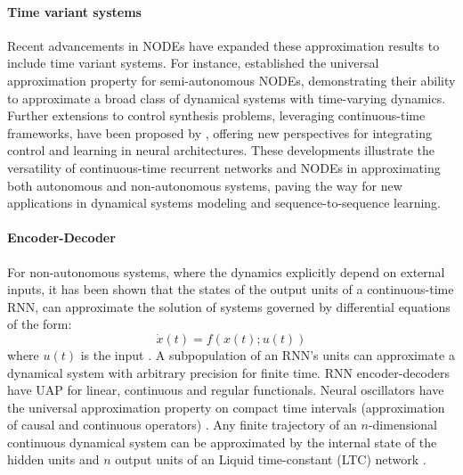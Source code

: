\documentclass{article}
\theoremstyle{definition}
\theoremstyle{remark}
\newcounter{ct}
\begin{document}
\paragraph{Time variant systems}
Recent advancements in NODEs have expanded these approximation results to include time variant systems. For instance, \citet{li2024universal} established the universal approximation property for semi-autonomous NODEs, demonstrating their ability to approximate a broad class of dynamical systems with time-varying dynamics. Further extensions to control synthesis problems, leveraging continuous-time frameworks, have been proposed by \citet{mei2024controlsynth}, offering new perspectives for integrating control and learning in neural architectures.
%
These developments illustrate the versatility of continuous-time recurrent networks and NODEs in approximating both autonomous and non-autonomous systems, paving the way for new applications in dynamical systems modeling and sequence-to-sequence learning.


\paragraph{Encoder-Decoder}
For non-autonomous systems, where the dynamics explicitly depend on external inputs, it has been shown that the states of the output units of a continuous-time RNN, can approximate the solution of systems governed by differential equations of the form:
\[
\dot{x}(t) = f(x(t); u(t)) 
\]
where $u(t)$ is the input \citep{garces2012strategies}. %
A subpopulation of an RNN's units can approximate a dynamical system with arbitrary precision for finite time\citep{kambhampati2000approximation}. %
RNN encoder-decoders have UAP for linear, continuous and regular functionals\citep{li2021approximationencdec}.
Neural oscillators have the universal approximation property on compact time intervals (approximation of causal and continuous operators) \citep{lanthaler2023neuraloscillators}.
%
Any finite trajectory of an $n$-dimensional continuous dynamical system can be approximated by the internal state of the hidden units and $n$ output units of an Liquid time-constant (LTC) network \citep{hasani2018liquid}.
\end{document}
